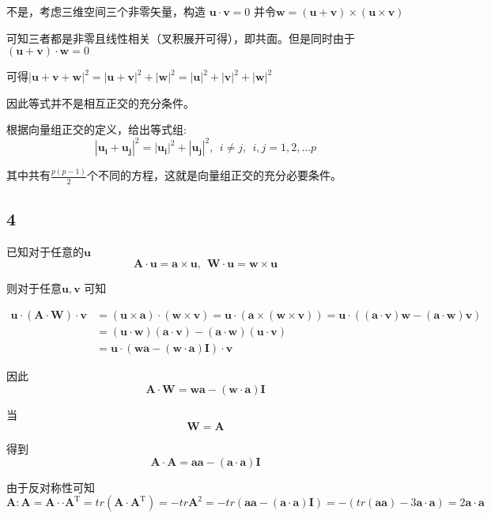 \documentclass[UTF8,c5size]{ctexart}
\begin{document}
不是，考虑三维空间三个非零矢量，构造
$
\bm{u}\cdot\bm{v}=0
$
并令$\bm{w}=(\bm{u}+\bm{v})\times(\bm{u}\times\bm{v})$

可知三者都是非零且线性相关（叉积展开可得），即共面。但是同时由于
$\bm{(u+v)}\cdot\bm{w}=0$

可得$|\bm{u}+\bm{v}+\bm{w}|^2=|\bm{u}+\bm{v}|^2+|\bm{w}|^2
=|\bm{u}|^2+|\bm{v}|^2+|\bm{w}|^2$

因此等式并不是相互正交的充分条件。

根据向量组正交的定义，给出等式组:
$$
|\bm{u_i}+\bm{u_j}|^2=|\bm{u_i}|^2+|\bm{u_j}|^2, \ \  i\neq j, \ \ i,j=1,2,...p 
$$

其中共有$\frac{p(p-1)}{2}$个不同的方程，这就是向量组正交的充分必要条件。

\subsection*{4}

已知对于任意的$\bm{u}$
\begin{equation*}
    \bm{A} \cdot \bm{u} = \bm{a}\times\bm{u},\ \ 
    \bm{W} \cdot \bm{u} = \bm{w}\times\bm{u}
\end{equation*}

则对于任意$\bm{u},\bm{v}$
可知

\begin{equation*}
    \begin{split}
        \bm{u}\cdot(\bm{A}\cdot\bm{W})\cdot\bm{v}
        &=(\bm{u}\times\bm{a})\cdot(\bm{w}\times\bm{v})
        =\bm{u}\cdot(\bm{a}\times(\bm{w}\times\bm{v}))
        =\bm{u}\cdot((\bm{a}\cdot\bm{v})\bm{w}-(\bm{a}\cdot\bm{w})\bm{v})
        \\
        &=(\bm{u}\cdot\bm{w})(\bm{a}\cdot\bm{v})-
        (\bm{a}\cdot\bm{w})(\bm{u}\cdot\bm{v})\\
        &=\bm{u}\cdot\left(\bm{w}\bm{a}-(\bm{w}\cdot\bm{a})\bm{I}\right)\cdot\bm{v}
    \end{split}
\end{equation*}

因此
\begin{equation*}
    \bm{A}\cdot\bm{W}=\bm{w}\bm{a}-(\bm{w}\cdot\bm{a})\bm{I}
\end{equation*}

当
$$
\bm{W}=\bm{A}
$$

得到
\begin{equation*}
    \bm{A}\cdot\bm{A}=\bm{a}\bm{a}-(\bm{a}\cdot\bm{a})\bm{I}
\end{equation*}
 
由于反对称性可知
$$
\bm{A}:\bm{A}=
\bm{A}\cdot\cdot\bm{A}^\mathrm{T}=tr(\bm{A}\cdot\bm{A}^\mathrm{T})
=-tr\bm{A}^2=-tr(\bm{a}\bm{a}-(\bm{a}\cdot\bm{a})\bm{I})
=-(tr(\bm{a}\bm{a})-3\bm{a}\cdot\bm{a})=2\bm{a}\cdot\bm{a}
$$
\end{document}
